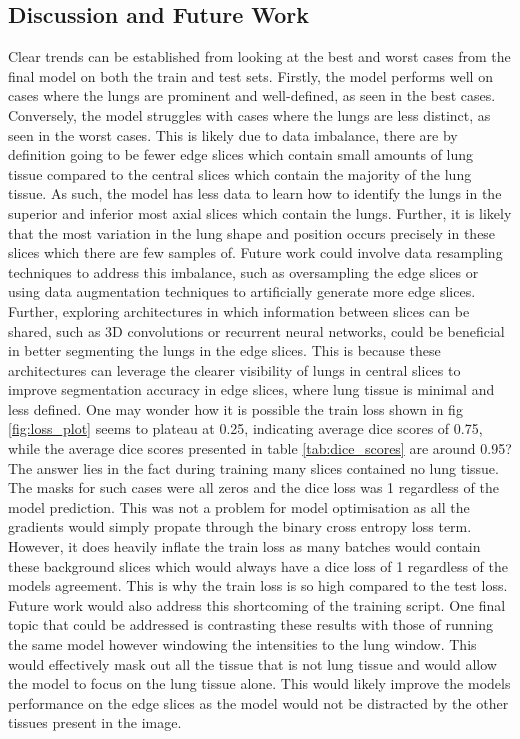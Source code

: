 \documentclass[11pt]{article}
\begin{document}
\subsection{Discussion and Future Work}
Clear trends can be established from looking at the best and worst cases from the final model on both the train and test sets.
Firstly, the model performs well on cases where the lungs are prominent and well-defined, as seen in the best cases. Conversely, the model struggles with cases where the lungs are less distinct, as seen in the worst cases. This is likely due to data imbalance, there are by definition going to be fewer edge slices which contain small amounts of lung tissue compared to the central slices which contain the majority of the lung tissue. As such, the model has less data to learn how to identify the lungs in the superior and inferior most axial slices which contain the lungs. Further, it is likely that the most variation in the lung shape and position occurs precisely in these slices which there are few samples of. Future work could involve data resampling techniques to address this imbalance, such as oversampling the edge slices or using data augmentation techniques to artificially generate more edge slices. Further, exploring architectures in which information between slices can be shared, such as 3D convolutions or recurrent neural networks, could be beneficial in better segmenting the lungs in the edge slices. This is because these architectures can leverage the clearer visibility of lungs in central slices to improve segmentation accuracy in edge slices, where lung tissue is minimal and less defined. 
One may wonder how it is possible the train loss shown in fig \ref{fig:loss_plot} seems to plateau at 0.25, indicating average dice scores of 0.75, while the average dice scores presented in table \ref{tab:dice_scores} are around 0.95? The answer lies in the fact during training many slices contained no lung tissue. The masks for such cases were all zeros and the dice loss was 1 regardless of the model prediction. This was not a problem for model optimisation as all the gradients would simply propate through the binary cross entropy loss term. However, it does heavily inflate the train loss as many batches would contain these background slices which would always have a dice loss of 1 regardless of the models agreement. This is why the train loss is so high compared to the test loss. Future work would also address this shortcoming of the training script. One final topic that could be addressed is contrasting these results with those of running the same model however windowing the intensities to the lung window. This would effectively mask out all the tissue that is not lung tissue and would allow the model to focus on the lung tissue alone. This would likely improve the models performance on the edge slices as the model would not be distracted by the other tissues present in the image.
\end{document}
